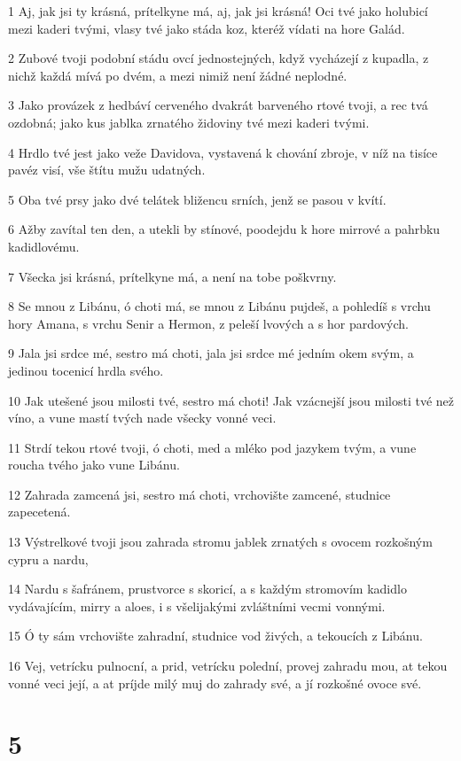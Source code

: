 \par 1 Aj, jak jsi ty krásná, prítelkyne má, aj, jak jsi krásná! Oci tvé jako holubicí mezi kaderi tvými, vlasy tvé jako stáda koz, kteréž vídati na hore Galád.
\par 2 Zubové tvoji podobní stádu ovcí jednostejných, když vycházejí z kupadla, z nichž každá mívá po dvém, a mezi nimiž není žádné neplodné.
\par 3 Jako provázek z hedbáví cerveného dvakrát barveného rtové tvoji, a rec tvá ozdobná; jako kus jablka zrnatého židoviny tvé mezi kaderi tvými.
\par 4 Hrdlo tvé jest jako veže Davidova, vystavená k chování zbroje, v níž na tisíce pavéz visí, vše štítu mužu udatných.
\par 5 Oba tvé prsy jako dvé telátek bližencu srních, jenž se pasou v kvítí.
\par 6 Ažby zavítal ten den, a utekli by stínové, poodejdu k hore mirrové a pahrbku kadidlovému.
\par 7 Všecka jsi krásná, prítelkyne má, a není na tobe poškvrny.
\par 8 Se mnou z Libánu, ó choti má, se mnou z Libánu pujdeš, a pohledíš s vrchu hory Amana, s vrchu Senir a Hermon, z peleší lvových a s hor pardových.
\par 9 Jala jsi srdce mé, sestro má choti, jala jsi srdce mé jedním okem svým, a jedinou tocenicí hrdla svého.
\par 10 Jak utešené jsou milosti tvé, sestro má choti! Jak vzácnejší jsou milosti tvé než víno, a vune mastí tvých nade všecky vonné veci.
\par 11 Strdí tekou rtové tvoji, ó choti, med a mléko pod jazykem tvým, a vune roucha tvého jako vune Libánu.
\par 12 Zahrada zamcená jsi, sestro má choti, vrchovište zamcené, studnice zapecetená.
\par 13 Výstrelkové tvoji jsou zahrada stromu jablek zrnatých s ovocem rozkošným cypru a nardu,
\par 14 Nardu s šafránem, prustvorce s skoricí, a s každým stromovím kadidlo vydávajícím, mirry a aloes, i s všelijakými zvláštními vecmi vonnými.
\par 15 Ó ty sám vrchovište zahradní, studnice vod živých, a tekoucích z Libánu.
\par 16 Vej, vetrícku pulnocní, a prid, vetrícku polední, provej zahradu mou, at tekou vonné veci její, a at príjde milý muj do zahrady své, a jí rozkošné ovoce své.

\chapter{5}

